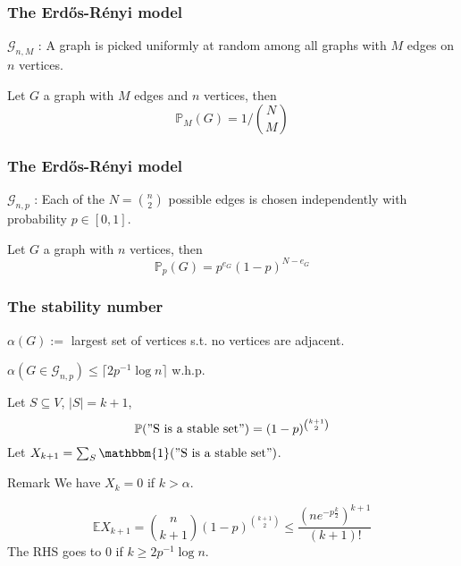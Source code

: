 \documentclass{beamer}
\begin{document}
	\begin{frame}
		\frametitle{The Erd\H{o}s-R\'enyi model}
		\begin{definition}[ER 1960]
			$\mathcal{G}_{n,M}$ : A graph is picked uniformly at random among all graphs with $M$ edges on $n$ vertices.
		\end{definition}
		Let $G$ a graph with $M$ edges and $n$ vertices, then
		\begin{equation}
			\mathbb{P}_M (G) = 1/\binom{N}{M}
		\end{equation}
	\end{frame}
	\begin{frame}
		\frametitle{The Erd\H{o}s-R\'enyi model}
		\begin{definition}[Gilbert 1959]
			$\mathcal{G}_{n,p}$ : Each of the $N = \binom{n}{2}$ possible edges is chosen independently with probability $p \in [0,1]$.
		\end{definition}
		Let $G$ a graph with $n$ vertices, then
		\begin{equation}
			\mathbb{P}_p (G) = p^{e_G}(1-p)^{N-e_G}
		\end{equation}
	\end{frame}
	\begin{frame}
		\frametitle{The stability number}
		\begin{definition}
			$\alpha(G) :=$ largest set of vertices s.t. no vertices are adjacent.
		\end{definition}
		\begin{theorem}
			$\alpha(G \in \mathcal{G}_{n,p}) \leq \lceil 2p^{-1}\log n\rceil$ w.h.p.
		\end{theorem}
	\end{frame}
	\begin{frame}
		Let $S \subseteq V$, $|S| = k+1$,
		\begin{equation}
			\mathbb{P}("\text{S is a stable set}") = (1-p)^{\binom{k+1}{2}}
		\end{equation}
		Let $X_{k+1} = \sum_{S} \mathbbm{1}("\text{S is a stable set}")$.
		\begin{block}{Remark}
			We have $X_k = 0$ if $k> \alpha$.
		\end{block}
		\begin{equation}
			\mathbb{E}X_{k+1} = \binom{n}{k+1} (1-p)^{\binom{k+1}{2}} \leq \frac{(ne^{-p\frac{k}{2}})^{k+1}}{(k+1)!}
		\end{equation}
		The RHS goes to 0 if $k \geq 2p^{-1}\log n$.
	\end{frame}
\end{document}
